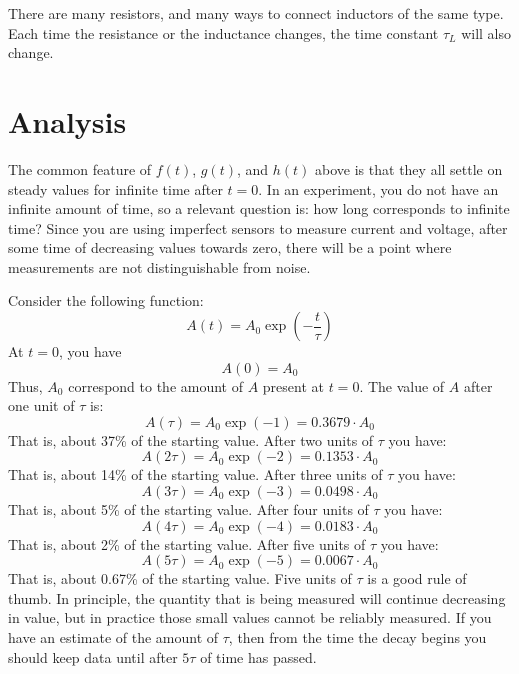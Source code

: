 There are many resistors, and many ways to connect inductors of the same type. Each time the resistance or the inductance changes, the time constant $\tau_{L}$ will also change.
%
\section{Analysis}
%
The common feature of $f(t)$, $g(t)$, and $h(t)$ above is that they all settle on steady values for infinite time after $t = 0$. In an experiment, you do not have an infinite amount of time, so a relevant question is: how long corresponds to infinite time? Since you are using imperfect sensors to measure current and voltage, after some time of decreasing values towards zero, there will be a point where measurements are not distinguishable from noise.

Consider the following function:
\begin{equation}
    A(t) = A_{0} \exp\left(- \frac{t}{\tau}\right)
\end{equation}
At $t = 0$, you have
\begin{equation}
    A(0) = A_{0}
\end{equation}
Thus, $A_{0}$ correspond to the amount of $A$ present at $t = 0$. The value of $A$ after one unit of $\tau$ is:
\begin{equation}
    A(\tau) = A_{0} \exp\left(-1\right) = 0.3679 \cdot A_{0}
\end{equation}
That is, about 37\% of the starting value. After two units of $\tau$ you have:
\begin{equation}
    A(2\tau) = A_{0} \exp\left(-2\right) = 0.1353 \cdot A_{0}
\end{equation}
That is, about 14\% of the starting value. After three units of $\tau$ you have:
\begin{equation}
    A(3\tau) = A_{0} \exp\left(-3\right) = 0.0498 \cdot A_{0}
\end{equation}
That is, about 5\% of the starting value. After four units of $\tau$ you have:
\begin{equation}
    A(4\tau) = A_{0} \exp\left(-4\right) = 0.0183 \cdot A_{0}
\end{equation}
That is, about 2\% of the starting value. After five units of $\tau$ you have:
\begin{equation}
    A(5\tau) = A_{0} \exp\left(-5\right) = 0.0067 \cdot A_{0}
\end{equation}
That is, about 0.67\% of the starting value. Five units of $\tau$ is a good rule of thumb. In principle, the quantity that is being measured will continue decreasing in value, but in practice those small values cannot be reliably measured. If you have an estimate of the amount of $\tau$, then from the time the decay begins you should keep data until after $5 \tau$ of time has passed.
%
%
